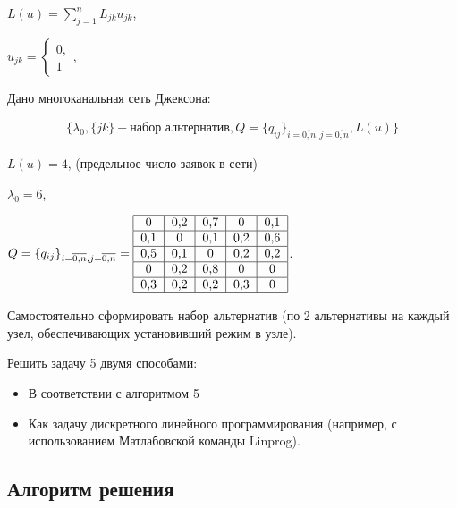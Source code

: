 \documentclass[a4paper, 12pt]{article}		%
\begin{document}
$ L(u) = \sum\limits_{j=1}^n L_{jk} u_{jk}$,

$ u_{jk} =
  \begin{cases}
    0,\\
    1
 \end{cases}$,
 
Дано многоканальная сеть Джексона:

\begin{gather*}
\{ \lambda_0, \{jk\} - \text{набор альтернатив}, Q=\{q_{ij}\}_{i=\overline{0,n}, j=\overline{0,n}}, L(u) \}
\end{gather*} 

$L(u) = 4$, (предельное число заявок в сети)

$\lambda_0 = 6$,

$Q=\{q_{ij}\}_{i=\overline{0,n}, j=\overline{0,n}} = \begin{tabular}{|c|c|c|c|c|}
\hline 
0 & 0,2 & 0,7 & 0 & 0,1 \\ 
\hline 
0,1 & 0 & 0,1 & 0,2 & 0,6 \\ 
\hline 
0,5 & 0,1 & 0 & 0,2 & 0,2 \\ 
\hline 
0 & 0,2 & 0,8 & 0 & 0 \\ 
\hline 
0,3 & 0,2 & 0,2 & 0,3 & 0 \\ 
\hline 
\end{tabular} $.

Самостоятельно сформировать набор альтернатив (по 2 альтернативы на каждый узел, обеспечивающих установивший режим в узле).

Решить задачу 5 двумя способами:

\begin{itemize}
\item В соответствии с алгоритмом 5
\item Как задачу дискретного линейного программирования (например, с использованием Матлабовской команды Linprog).
\end{itemize}

\subsection{Алгоритм решения}
\end{document}
